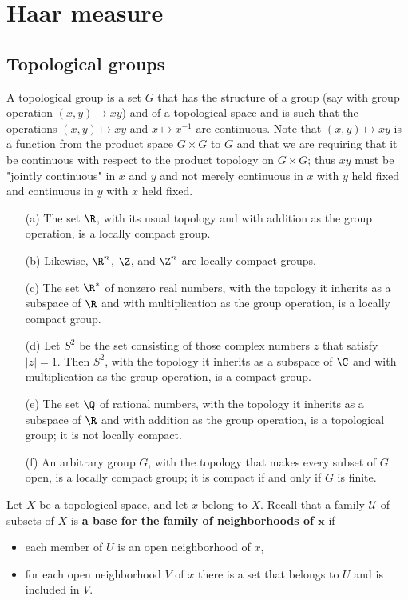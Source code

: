 \chapter{Haar measure}
\section{Topological groups}
A topological group is a set $G$ that has the structure of a group (say with group operation $(x,y)\mapsto xy$) and of a topological space and is such that the operations $(x,y)\mapsto xy$ and $x\mapsto x^{-1}$ are continuous. Note that $(x,y)\mapsto xy$ is a function from the product space $G\times G$ to $G$ and that we are requiring that it be continuous with respect to the product topology on $G\times G$; thus $xy$ must be "jointly continuous" in $x$ and $y$ and not merely continuous in $x$ with $y$ held fixed and continuous in $y$ with $x$ held fixed.
\begin{example}
\mbox{}
\begin{itemize}
\item[(a)] The set $\R$, with its usual topology and with addition as the group operation, is a locally compact group.
\item[(b)] Likewise, $\R^n$, $\Z$, and $\Z^n$ are locally compact groups.
\item[(c)] The set $\R^*$ of nonzero real numbers, with the topology it inherits as a subspace of $\R$ and with multiplication as the group operation, is a locally compact group.
\item[(d)] Let $S^2$ be the set consisting of those complex numbers $z$ that satisfy $|z|=1$. Then $S^2$, with the topology it inherits as a subspace of $\C$ and with multiplication as the group operation, is a compact group.
\item[(e)] The set $\Q$ of rational numbers, with the topology it inherits as a subspace of $\R$ and with addition as the group operation, is a topological group; it is not locally compact. 
\item[(f)] An arbitrary group $G$, with the topology that makes every subset of $G$ open, is a locally compact group; it is compact if and only if $G$ is finite. 
\end{itemize}
\end{example}
Let $X$ be a topological space, and let $x$ belong to $X$. Recall that a family $\mathcal{U}$ of subsets of $X$ is \textbf{a base for the family of neighborhoods of $\bm{x}$} if
\begin{itemize}
\item each member of $U$ is an open neighborhood of $x$,
\item for each open neighborhood $V$ of $x$ there is a set that belongs to $U$ and is included in $V$.
\end{itemize}
